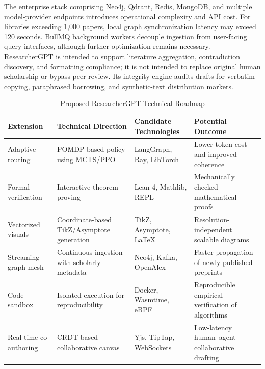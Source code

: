 \documentclass[conference]{IEEEtran}
\begin{document}
The enterprise stack comprising Neo4j, Qdrant, Redis, MongoDB, and multiple model-provider endpoints introduces operational complexity and API cost. For libraries exceeding 1,000 papers, local graph synchronization latency may exceed 120 seconds. BullMQ background workers decouple ingestion from user-facing query interfaces, although further optimization remains necessary. ResearcherGPT is intended to support literature aggregation, contradiction discovery, and formatting compliance; it is not intended to replace original human scholarship or bypass peer review. Its integrity engine audits drafts for verbatim copying, paraphrased borrowing, and synthetic-text distribution markers.

\begin{table}[!t]
\centering
\caption{Proposed ResearcherGPT Technical Roadmap}
\label{tab:roadmap}
\small
\begin{tabularx}{\textwidth}{@{}l X X X@{}}
\toprule
\textbf{Extension} & \textbf{Technical Direction} & \textbf{Candidate Technologies} & \textbf{Potential Outcome} \\
\midrule
Adaptive routing & POMDP-based policy using MCTS/PPO & LangGraph, Ray, LibTorch & Lower token cost and improved coherence \\
Formal verification & Interactive theorem proving & Lean 4, Mathlib, REPL & Mechanically checked mathematical proofs \\
Vectorized visuals & Coordinate-based TikZ/Asymptote generation & TikZ, Asymptote, \LaTeX & Resolution-independent scalable diagrams \\
Streaming graph mesh & Continuous ingestion with scholarly metadata & Neo4j, Kafka, OpenAlex & Faster propagation of newly published preprints \\
Code sandbox & Isolated execution for reproducibility & Docker, Wasmtime, eBPF & Reproducible empirical verification of algorithms \\
Real-time co-authoring & CRDT-based collaborative canvas & Yjs, TipTap, WebSockets & Low-latency human--agent collaborative drafting \\
\bottomrule
\end{tabularx}
\end{table}
\end{document}
